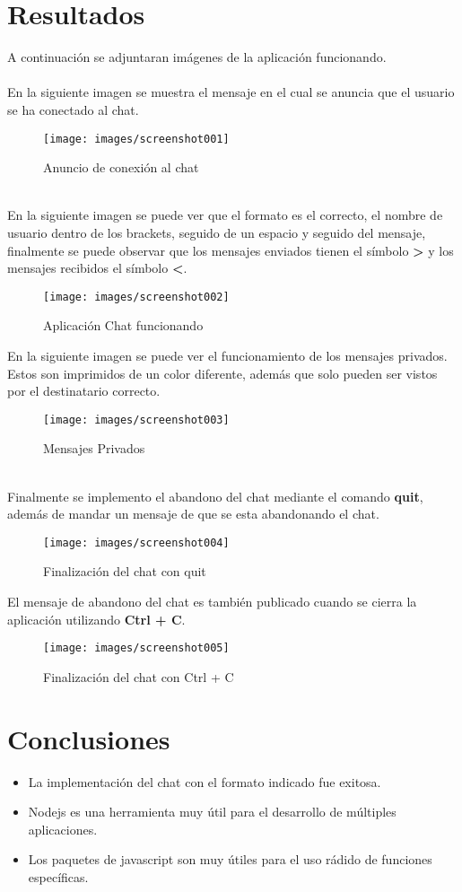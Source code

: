 \documentclass{article}
\begin{document}
\section{Resultados}
A continuaci\'on se adjuntaran im\'agenes de la aplicaci\'on funcionando.
\\~\\
En la siguiente imagen se muestra el mensaje en el cual se anuncia que el usuario se ha conectado al chat.
\begin{figure}[h!]
	\centering
	\texttt{[image: images/screenshot001]}
	\caption{Anuncio de conexi\'on al chat}
	\label{fig:screenshot001}
\end{figure}
\\
En la siguiente imagen se puede ver que el formato es el correcto, el nombre de usuario dentro de los brackets, seguido de un espacio y seguido del mensaje, finalmente se puede observar que los mensajes enviados tienen el s\'imbolo {\selectfont\textbf{>}} y los mensajes recibidos el s\'imbolo {\selectfont\textbf{<}}.
\begin{figure}[h!]
	\centering
	\texttt{[image: images/screenshot002]}
	\caption{Aplicaci\'on Chat funcionando}
	\label{fig:screenshot002}
\end{figure}
\clearpage
\noindent En la siguiente imagen se puede ver el funcionamiento de los mensajes privados. Estos son imprimidos de un color diferente, adem\'as que solo pueden ser vistos por el destinatario correcto.
\begin{figure}[h!]
	\centering
	\texttt{[image: images/screenshot003]}
	\caption{Mensajes Privados}
	\label{fig:screenshot003}
\end{figure}
\\
Finalmente se implemento el abandono del chat mediante el comando {\selectfont\textbf{quit}}, adem\'as de mandar un mensaje de que se esta abandonando el chat.
\begin{figure}[h!]
	\centering
	\texttt{[image: images/screenshot004]}
	\caption{Finalizaci\'on del chat con quit}
	\label{fig:screenshot004}
\end{figure}
\clearpage
\noindent El mensaje de abandono del chat es tambi\'en publicado cuando se cierra la aplicaci\'on utilizando {\selectfont\textbf{Ctrl + C}}.
\begin{figure}[h!]
	\centering
	\texttt{[image: images/screenshot005]}
	\caption{Finalizaci\'on del chat con Ctrl + C}
	\label{fig:screenshot005}
\end{figure}
\section{Conclusiones}
\begin{itemize}
	\item La implementaci\'on del chat con el formato indicado fue exitosa.
	\item Nodejs es una herramienta muy \'util para el desarrollo de m\'ultiples aplicaciones.
	\item Los paquetes de javascript son muy \'utiles para el uso r\'adido de funciones espec\'ificas.
\end{itemize}
\end{document}
